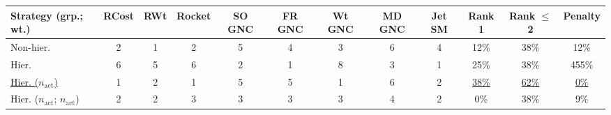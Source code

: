 \begin{tabular}{lccccccccccc}
\toprule
Strategy (grp.; wt.) & RCost & RWt & Rocket & SO GNC & FR GNC & Wt GNC & MD GNC & Jet SM & Rank 1 & Rank $\leq$ 2 & Penalty \\
\midrule
Non-hier. & {\cellcolor[HTML]{05712F}} \color[HTML]{F1F1F1} 2 & {\cellcolor[HTML]{00441B}} \color[HTML]{F1F1F1} 1 & {\cellcolor[HTML]{05712F}} \color[HTML]{F1F1F1} 2 & {\cellcolor[HTML]{8ED08B}} \color[HTML]{000000} 5 & {\cellcolor[HTML]{56B567}} \color[HTML]{F1F1F1} 4 & {\cellcolor[HTML]{2C944C}} \color[HTML]{F1F1F1} 3 & {\cellcolor[HTML]{BCE4B5}} \color[HTML]{000000} 6 & {\cellcolor[HTML]{56B567}} \color[HTML]{F1F1F1} 4 & {\cellcolor[HTML]{DEEBF7}} \color[HTML]{000000} 12\% & {\cellcolor[HTML]{9DCAE1}} \color[HTML]{000000} 38\% & {\cellcolor[HTML]{006C2C}} \color[HTML]{F1F1F1} 12\% \\
Hier. & {\cellcolor[HTML]{BCE4B5}} \color[HTML]{000000} 6 & {\cellcolor[HTML]{8ED08B}} \color[HTML]{000000} 5 & {\cellcolor[HTML]{BCE4B5}} \color[HTML]{000000} 6 & {\cellcolor[HTML]{05712F}} \color[HTML]{F1F1F1} 2 & {\cellcolor[HTML]{00441B}} \color[HTML]{F1F1F1} 1 & {\cellcolor[HTML]{F7FCF5}} \color[HTML]{000000} 8 & {\cellcolor[HTML]{2C944C}} \color[HTML]{F1F1F1} 3 & {\cellcolor[HTML]{00441B}} \color[HTML]{F1F1F1} 1 & {\cellcolor[HTML]{C6DBEF}} \color[HTML]{000000} 25\% & {\cellcolor[HTML]{9DCAE1}} \color[HTML]{000000} 38\% & {\cellcolor[HTML]{F7FCF5}} \color[HTML]{000000} 455\% \\
\underline{Hier. ($n_{\mathrm{act}}$)} & {\cellcolor[HTML]{00441B}} \color[HTML]{F1F1F1} 1 & {\cellcolor[HTML]{05712F}} \color[HTML]{F1F1F1} 2 & {\cellcolor[HTML]{00441B}} \color[HTML]{F1F1F1} 1 & {\cellcolor[HTML]{8ED08B}} \color[HTML]{000000} 5 & {\cellcolor[HTML]{8ED08B}} \color[HTML]{000000} 5 & {\cellcolor[HTML]{00441B}} \color[HTML]{F1F1F1} 1 & {\cellcolor[HTML]{BCE4B5}} \color[HTML]{000000} 6 & {\cellcolor[HTML]{05712F}} \color[HTML]{F1F1F1} 2 & {\cellcolor[HTML]{9DCAE1}} \color[HTML]{000000} \underline{38\%} & {\cellcolor[HTML]{4191C6}} \color[HTML]{F1F1F1} \underline{62\%} & {\cellcolor[HTML]{00441B}} \color[HTML]{F1F1F1} \underline{0\%} \\
Hier. ($n_{\mathrm{act}}$; $n_{\mathrm{act}}$) & {\cellcolor[HTML]{05712F}} \color[HTML]{F1F1F1} 2 & {\cellcolor[HTML]{05712F}} \color[HTML]{F1F1F1} 2 & {\cellcolor[HTML]{2C944C}} \color[HTML]{F1F1F1} 3 & {\cellcolor[HTML]{2C944C}} \color[HTML]{F1F1F1} 3 & {\cellcolor[HTML]{2C944C}} \color[HTML]{F1F1F1} 3 & {\cellcolor[HTML]{2C944C}} \color[HTML]{F1F1F1} 3 & {\cellcolor[HTML]{56B567}} \color[HTML]{F1F1F1} 4 & {\cellcolor[HTML]{05712F}} \color[HTML]{F1F1F1} 2 & {\cellcolor[HTML]{F7FBFF}} \color[HTML]{000000} 0\% & {\cellcolor[HTML]{9DCAE1}} \color[HTML]{000000} 38\% & {\cellcolor[HTML]{006328}} \color[HTML]{F1F1F1} 9\% \\

\end{tabular}
